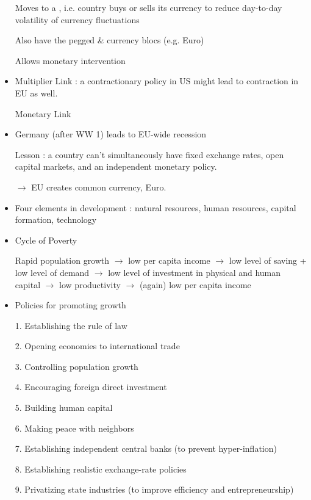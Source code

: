 \documentclass{article}
\begin{document}
\begin{itemize}
Moves to a , i.e. country buys or sells its currency to reduce day-to-day volatility of currency fluctuations

Also have the pegged \& currency blocs (e.g. Euro)

Allows monetary intervention

\item Multiplier Link : a contractionary policy in US might lead to contraction in EU as well.

Monetary Link
\item Germany (after WW 1) leads to EU-wide recession

Lesson : a country can't simultaneously have fixed exchange rates, open capital markets, and an independent monetary policy.

$\rightarrow$ EU creates common currency, Euro.
\end{itemize}













\newpage
{}
\begin{itemize}
\item Four elements in development : natural resources, human resources, capital formation, technology

\item Cycle of Poverty

Rapid population growth $\rightarrow$ low per capita income $\rightarrow$ low level of saving + low level of demand $\rightarrow$ low level of investment in physical and human capital $\rightarrow$ low productivity $\rightarrow$ (again) low per capita income

\item Policies for promoting growth

1. Establishing the rule of law

2. Opening economies to international trade

3. Controlling population growth

4. Encouraging foreign direct investment

5. Building human capital

6. Making peace with neighbors

7. Establishing independent central banks (to prevent hyper-inflation)

8. Establishing realistic exchange-rate policies

9. Privatizing state industries (to improve efficiency and entrepreneurship)
\end{itemize}
\end{document}
